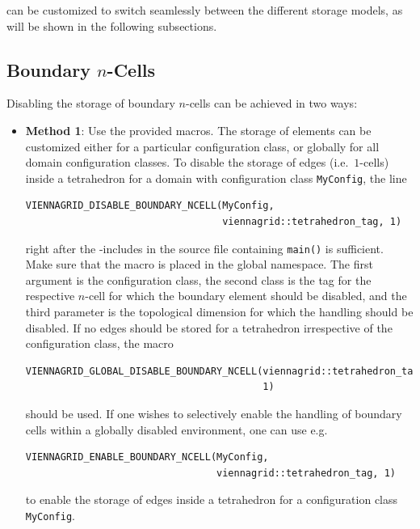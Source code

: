 {\ViennaGrid} can be customized to switch seamlessly between the different storage models, as will be shown in the following subsections.


\subsection{Boundary $n$-Cells} \label{subsec:boundary-ncells-storage}

Disabling the storage of boundary $n$-cells can be achieved in two ways:
\begin{itemize}
 \item \textbf{Method 1}: Use the provided macros. The storage of elements can be customized either for a particular configuration class, or globally for all domain configuration classes. To disable the storage of edges (i.e.~$1$-cells) inside a tetrahedron for a domain with configuration class \lstinline|MyConfig|, the line
  \begin{lstlisting}
VIENNAGRID_DISABLE_BOUNDARY_NCELL(MyConfig,
                                  viennagrid::tetrahedron_tag, 1)
  \end{lstlisting}
right after the {\ViennaGrid}-includes in the source file containing \lstinline|main()| is sufficient. Make sure that the macro is placed in the global namespace. The first argument is the configuration class, the second class is the tag for the respective $n$-cell for which the boundary element should be disabled, and the third parameter is the topological dimension for which the handling should be disabled.
 If no edges should be stored for a tetrahedron irrespective of the configuration class, the macro
  \begin{lstlisting}
VIENNAGRID_GLOBAL_DISABLE_BOUNDARY_NCELL(viennagrid::tetrahedron_tag,
                                         1)
  \end{lstlisting}
 should be used. If one wishes to selectively enable the handling of boundary cells within a globally disabled environment, one can use e.g.
  \begin{lstlisting}
VIENNAGRID_ENABLE_BOUNDARY_NCELL(MyConfig,
                                 viennagrid::tetrahedron_tag, 1)
  \end{lstlisting}
 to enable the storage of edges inside a tetrahedron for a configuration class \lstinline|MyConfig|.


\end{itemize}
